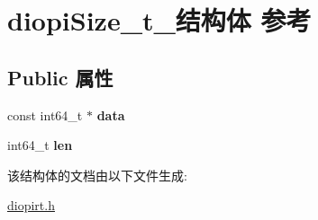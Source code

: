 \hypertarget{structdiopiSize__t__}{\section{diopi\-Size\-\_\-t\-\_\-结构体 参考}
\label{structdiopiSize__t__}
}
\subsection*{Public 属性}
\begin{DoxyCompactItemize}
\item 
\hypertarget{structdiopiSize__t___a62e6cb61d851e695a71e1cb52117e530}{const int64\-\_\-t $\ast$ {\bfseries data}}\label{structdiopiSize__t___a62e6cb61d851e695a71e1cb52117e530}

\item 
\hypertarget{structdiopiSize__t___aca81f3ac4b81f978c446299c54cb1ecf}{int64\-\_\-t {\bfseries len}}\label{structdiopiSize__t___aca81f3ac4b81f978c446299c54cb1ecf}

\end{DoxyCompactItemize}


该结构体的文档由以下文件生成\-:\begin{DoxyCompactItemize}
\item 
\hyperlink{diopirt_8h}{diopirt.\-h}\end{DoxyCompactItemize}

